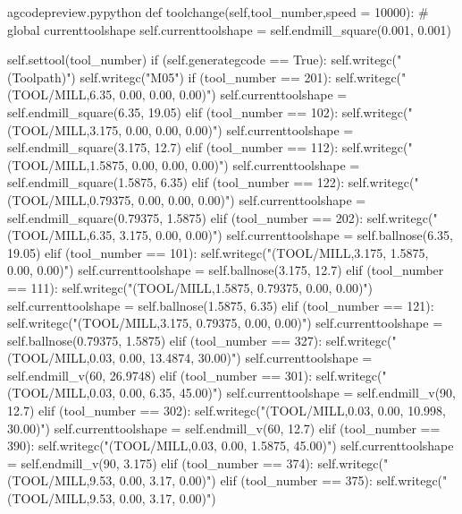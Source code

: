 \documentclass{ltxdoc}
\begin{document}
\lstset{firstnumber=\thegcpy}
\begin{writecode}{a}{gcodepreview.py}{python}
    def toolchange(self,tool_number,speed = 10000):
#        global currenttoolshape
        self.currenttoolshape = self.endmill_square(0.001, 0.001)    
            
        self.settool(tool_number)
        if (self.generategcode == True):
            self.writegc("(Toolpath)")
            self.writegc("M05")
        if (tool_number == 201):
            self.writegc("(TOOL/MILL,6.35, 0.00, 0.00, 0.00)")
            self.currenttoolshape = self.endmill_square(6.35, 19.05)
        elif (tool_number == 102):
            self.writegc("(TOOL/MILL,3.175, 0.00, 0.00, 0.00)")
            self.currenttoolshape = self.endmill_square(3.175, 12.7)
        elif (tool_number == 112):
            self.writegc("(TOOL/MILL,1.5875, 0.00, 0.00, 0.00)")
            self.currenttoolshape = self.endmill_square(1.5875, 6.35)
        elif (tool_number == 122):
            self.writegc("(TOOL/MILL,0.79375, 0.00, 0.00, 0.00)")
            self.currenttoolshape = self.endmill_square(0.79375, 1.5875)
        elif (tool_number == 202):
            self.writegc("(TOOL/MILL,6.35, 3.175, 0.00, 0.00)")
            self.currenttoolshape = self.ballnose(6.35, 19.05)
        elif (tool_number == 101):
            self.writegc("(TOOL/MILL,3.175, 1.5875, 0.00, 0.00)")
            self.currenttoolshape = self.ballnose(3.175, 12.7)
        elif (tool_number == 111):
            self.writegc("(TOOL/MILL,1.5875, 0.79375, 0.00, 0.00)")
            self.currenttoolshape = self.ballnose(1.5875, 6.35)
        elif (tool_number == 121):
            self.writegc("(TOOL/MILL,3.175, 0.79375, 0.00, 0.00)")
            self.currenttoolshape = self.ballnose(0.79375, 1.5875)
        elif (tool_number == 327):
            self.writegc("(TOOL/MILL,0.03, 0.00, 13.4874, 30.00)")
            self.currenttoolshape = self.endmill_v(60, 26.9748)
        elif (tool_number == 301):
            self.writegc("(TOOL/MILL,0.03, 0.00, 6.35, 45.00)")
            self.currenttoolshape = self.endmill_v(90, 12.7)
        elif (tool_number == 302):
            self.writegc("(TOOL/MILL,0.03, 0.00, 10.998, 30.00)")
            self.currenttoolshape = self.endmill_v(60, 12.7)
        elif (tool_number == 390):
            self.writegc("(TOOL/MILL,0.03, 0.00, 1.5875, 45.00)")
            self.currenttoolshape = self.endmill_v(90, 3.175)
        elif (tool_number == 374):
            self.writegc("(TOOL/MILL,9.53, 0.00, 3.17, 0.00)")
        elif (tool_number == 375):
            self.writegc("(TOOL/MILL,9.53, 0.00, 3.17, 0.00)")

\end{writecode}
\end{document}
